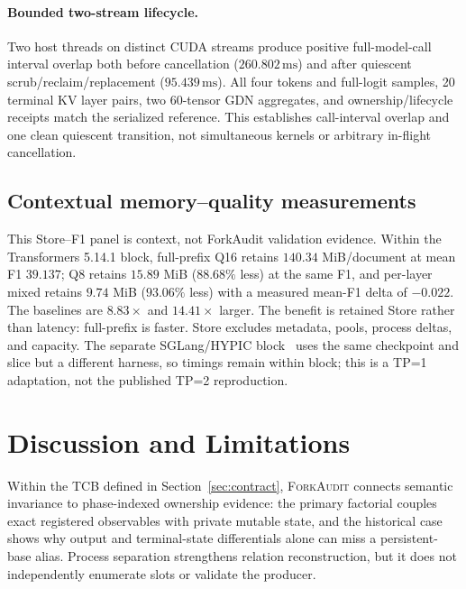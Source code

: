\documentclass{article}
\newcommand{\method}{\textsc{ForkAudit}}
\begin{document}
\paragraph{Bounded two-stream lifecycle.}
Two host threads on distinct CUDA streams produce positive full-model-call
interval overlap both before cancellation ($260.802\,\mathrm{ms}$) and after
quiescent scrub/reclaim/replacement ($95.439\,\mathrm{ms}$).  All four tokens
and full-logit samples, 20 terminal KV layer pairs, two 60-tensor GDN
aggregates, and ownership/lifecycle receipts match the serialized reference.
This establishes call-interval overlap and one clean quiescent transition, not
simultaneous kernels or arbitrary in-flight cancellation.

\FloatBarrier
\subsection{Contextual memory--quality measurements}

This Store--F1 panel is context, not ForkAudit validation evidence.  Within the
Transformers 5.14.1 block, full-prefix Q16 retains $140.34$ MiB/document at mean
F1 $39.137$; Q8 retains $15.89$ MiB ($88.68\%$ less) at the same F1, and
per-layer mixed retains $9.74$ MiB ($93.06\%$ less) with a measured mean-F1
delta of $-0.022$.  The baselines are $8.83\times$ and $14.41\times$ larger.
The benefit is retained Store rather than latency: full-prefix is faster.
Store excludes metadata, pools, process deltas, and capacity.  The separate
SGLang/HYPIC block~\citep{liu2026hypic} uses the same checkpoint and slice but a
different harness, so timings remain within block; this is a TP=1 adaptation,
not the published TP=2 reproduction.


\FloatBarrier

\section{Discussion and Limitations}
\label{sec:limitations}

Within the TCB defined in Section~\ref{sec:contract}, \method{} connects
semantic invariance to phase-indexed ownership evidence: the primary factorial couples exact registered
observables with private mutable state, and the historical case shows why
output and terminal-state differentials alone can miss a persistent-base
alias.  Process separation strengthens relation reconstruction, but it does
not independently enumerate slots or validate the producer.
\end{document}
